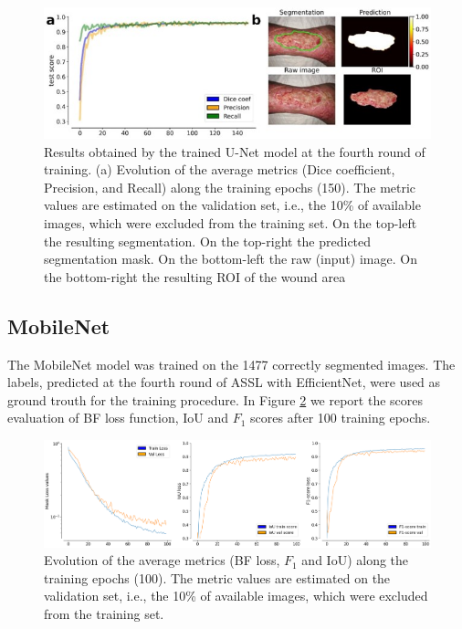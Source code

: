 \documentclass[../main.tex]{subfiles}
\begin{document}
\begin{figure}[H] 
\begin{center}
\includegraphics[width=16cm]{images/efficient-net-deepskin.jpg}
\caption{\small{Results obtained by the trained U-Net model at the fourth round of training. (a) Evolution of the average metrics (Dice coefficient, Precision, and Recall) along the training epochs (150). The metric values are estimated on the validation set, i.e., the 10\% of available images, which were excluded from the training set. On the top-left the resulting segmentation. On the top-right the predicted segmentation mask. On the bottom-left the raw (input) image. On the bottom-right the resulting ROI of the wound area}}\label{fig:eff-deepskin-train}
\end{center}
\end{figure}

\subsection{MobileNet}

The MobileNet model was trained on the 1477 correctly segmented images. The labels, predicted at the fourth round of ASSL with EfficientNet, were used as ground trouth for the training procedure.
In Figure \ref{fig:mob-deepskin-train} we report the scores evaluation of BF loss function, IoU and $F_1$ scores after 100 training epochs. 

\begin{figure}[H] 
\begin{center}
\includegraphics[width=16cm]{images/mobilenet_training_deepskin.png}
\caption{\small{Evolution of the average metrics (BF loss, $F_1$ and IoU) along the training epochs (100). The metric values are estimated on the validation set, i.e., the 10\% of available images, which were excluded from the training set.}}\label{fig:mob-deepskin-train}
\end{center}
\end{figure}
\end{document}
